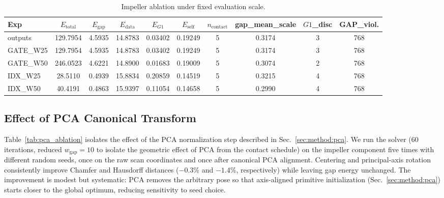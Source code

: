 \documentclass{ieeeaccess}
\begin{document}
\begin{table}[t]
  \caption{Impeller ablation under fixed evaluation scale.}
  \label{tab:impeller_ablation}
  \centering
  \setlength{\tabcolsep}{9pt}
  \scriptsize
  \begin{tabular}{
      l
      S[table-format=3.4]
      S[table-format=1.4]
      S[table-format=2.4]
      S[table-format=1.5]
      S[table-format=1.5]
      S[table-format=1.0]
      S[table-format=1.4]
      S[table-format=1.0]
      S[table-format=3.0]
    }
    \toprule
    \textbf{Exp} & {\textbf{$E_{\text{total}}$}}
                 & {\textbf{$E_{\text{gap}}$}}
                 & {\textbf{$E_{\text{data}}$}}
                 & {\textbf{$E_{G1}$}}
                 & {\textbf{$E_{\text{self}}$}}
                 & {\textbf{$n_{\text{contact}}$}}
                 & {\textbf{gap\_mean\_scale}}
                 & {$G1$\textbf{\_disc}}
                 & {\textbf{GAP\_viol.}} \\
    \midrule
    outputs   & 129.7954 & 4.5935 & 14.8783 & 0.03402 & 0.19249 & 5 & 0.3174 & 3 & 768 \\
    GATE\_W25 & 129.7954 & 4.5935 & 14.8783 & 0.03402 & 0.19249 & 5 & 0.3174 & 3 & 768 \\
    GATE\_W50 & 246.0523 & 4.6221 & 14.8900 & 0.01683 & 0.19009 & 5 & 0.3074 & 2 & 768 \\
    IDX\_W25  &  28.5110 & 0.4939 & 15.8834 & 0.20859 & 0.14519 & 5 & 0.3215 & 4 & 768 \\
    IDX\_W50  &  40.4191 & 0.4863 & 15.9397 & 0.11054 & 0.14658 & 5 & 0.2990 & 4 & 768 \\
    \bottomrule
  \end{tabular}
\end{table}

\subsection{Effect of PCA Canonical Transform}
\label{sec:pca_ablation}
Table~\ref{tab:pca_ablation} isolates the effect of the PCA normalization
step described in Sec.~\ref{sec:method:pca}.
We run the solver (60 iterations, reduced $w_{\text{gap}}{=}10$ to
isolate the geometric effect of PCA from the contact schedule)
on the impeller component five times with different random seeds,
once on the raw scan coordinates and once after canonical PCA alignment.
Centering and principal-axis rotation consistently improve Chamfer and
Hausdorff distances ($-0.3\%$ and $-1.4\%$, respectively) while leaving
gap energy unchanged.
The improvement is modest but systematic: PCA removes the arbitrary
pose so that axis-aligned primitive initialization (Sec.~\ref{sec:method:pca})
starts closer to the global optimum, reducing sensitivity to seed choice.
\end{document}
